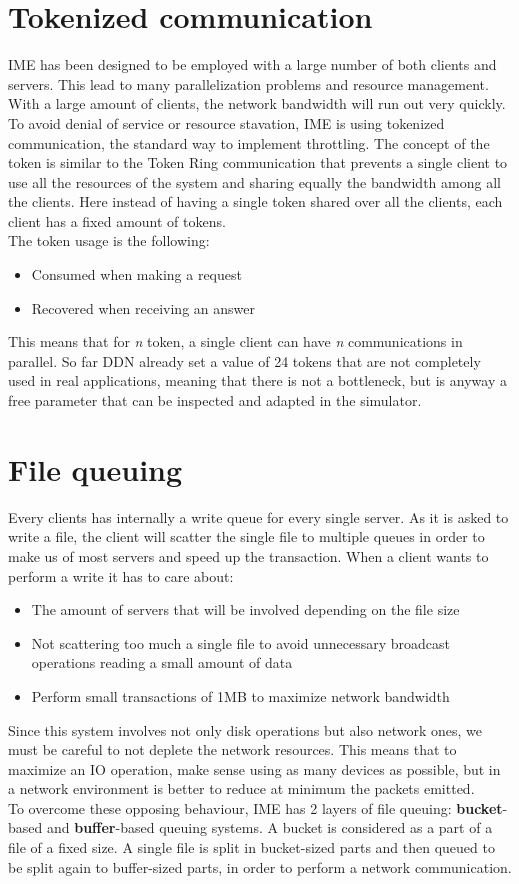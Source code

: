 \section{Tokenized communication}
IME has been designed to be employed with a large number of both clients and
servers. This lead to many parallelization problems and resource management.
With a large amount of clients, the network bandwidth will run out very quickly.
To avoid denial of service or resource stavation, IME is using tokenized
communication, the standard way to implement throttling. The concept of the
token is similar to the Token Ring communication \cite{token-ring} that prevents
a single client to use all the resources of the system and sharing equally the
bandwidth among all the clients.  Here instead of having a single token shared
over all the clients, each client has a fixed amount of tokens.\\
The token usage is the following:
\begin{itemize}
    \item Consumed when making a request
    \item Recovered when receiving an answer
\end{itemize}
This means that for \textit{n} token, a single client can have \textit{n}
communications in parallel.  So far DDN already set a value of 24 tokens that
are not completely used in real applications, meaning that there is not a
bottleneck, but is anyway a free parameter that can be inspected and adapted in
the simulator.



\section{File queuing}
Every clients has internally a write queue for every single server. As it is
asked to write a file, the client will scatter the single file to multiple
queues in order to make us of most servers and speed up the transaction.
When a client wants to perform a write it has to care about:
\begin{itemize}
    \item The amount of servers that will be involved depending on the file size
    \item Not scattering too much a single file to avoid unnecessary broadcast
        operations reading a small amount of data
    \item Perform small transactions of 1MB to maximize network bandwidth
\end{itemize}
Since this system involves not only disk operations but also network ones, we
must be careful to not deplete the network resources. This means that to
maximize an IO operation, make sense using as many devices as possible, but in
a network environment is better to reduce at minimum the packets emitted. \\ To
overcome these opposing behaviour, IME has 2 layers of file queuing:
\textbf{bucket}-based and \textbf{buffer}-based queuing systems.  A bucket is
considered as a part of a file of a fixed size. A single file is split in
bucket-sized parts and then queued to be split again to buffer-sized parts, in
order to perform a network communication.


